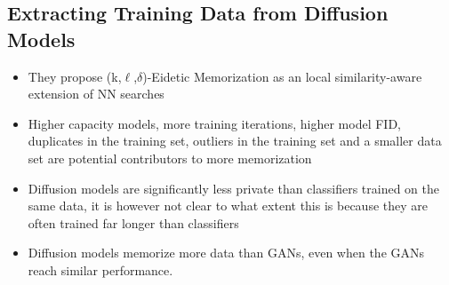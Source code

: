 \documentclass{article}
\begin{document}
\subsection{Extracting Training Data from Diffusion Models}
\begin{tldr}
    \begin{itemize}
    \item They propose (k,$\ell$,$\delta$)-Eidetic Memorization as an local similarity-aware extension of NN searches
    \item Higher capacity models, more training iterations, higher model FID, duplicates in the training set, outliers in the training set and a smaller data set are potential contributors to more memorization
    \item Diffusion models are significantly less private than classifiers trained on the same data, it is however not clear to what extent this is because they are often trained far longer than classifiers
    \item Diffusion models memorize more data than GANs, even when the GANs reach similar performance. 
    \end{itemize}
\end{tldr}
\end{document}
